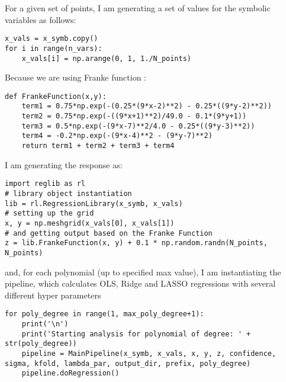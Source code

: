 For a given set of points, I am generating a set of values for the symbolic variables as follows:
\begin{lstlisting}
x_vals = x_symb.copy()
for i in range(n_vars):
    x_vals[i] = np.arange(0, 1, 1./N_points)
\end{lstlisting}
Because we are using Franke function \cite{Morten}:
\begin{lstlisting}
def FrankeFunction(x,y):
    term1 = 0.75*np.exp(-(0.25*(9*x-2)**2) - 0.25*((9*y-2)**2))
    term2 = 0.75*np.exp(-((9*x+1)**2)/49.0 - 0.1*(9*y+1))
    term3 = 0.5*np.exp(-(9*x-7)**2/4.0 - 0.25*((9*y-3)**2))
    term4 = -0.2*np.exp(-(9*x-4)**2 - (9*y-7)**2)
    return term1 + term2 + term3 + term4
\end{lstlisting}
I am generating the response as:
\begin{lstlisting}
import reglib as rl
# library object instantiation
lib = rl.RegressionLibrary(x_symb, x_vals)
# setting up the grid
x, y = np.meshgrid(x_vals[0], x_vals[1])
# and getting output based on the Franke Function
z = lib.FrankeFunction(x, y) + 0.1 * np.random.randn(N_points, N_points)
\end{lstlisting}
and, for each polynomial (up to specified max value), I am instantiating the pipeline, which calculates OLS, Ridge and LASSO regressions with several different hyper parameters
\begin{lstlisting}
for poly_degree in range(1, max_poly_degree+1):
    print('\n')
    print('Starting analysis for polynomial of degree: ' + str(poly_degree))
    pipeline = MainPipeline(x_symb, x_vals, x, y, z, confidence, sigma, kfold, lambda_par, output_dir, prefix, poly_degree)
    pipeline.doRegression()
\end{lstlisting}

